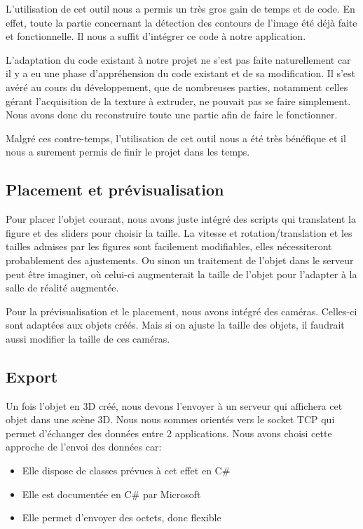 \documentclass[a4paper,11pt]{article}
\begin{document}
			L'utilisation de cet outil nous a permis un très gros gain de temps et de code. En effet, toute la partie concernant la détection des contours de l'image été déjà faite et fonctionnelle. Il nous a suffit d'intégrer ce code à notre application.
			
			L'adaptation du code existant à notre projet ne s'est pas faite naturellement car il y a eu une phase d'appréhension du code existant et de sa modification. Il s'est avéré au cours du développement, que de nombreuses parties, notamment celles gérant l'acquisition de la texture à extruder, ne pouvait pas se faire simplement. Nous avons donc du reconstruire toute une partie afin de faire le fonctionner.
			
			Malgré ces contre-temps, l'utilisation de cet outil nous a été très bénéfique et il nous a surement permis de finir le projet dans les temps.

		\subsection{Placement et prévisualisation}
		
			Pour placer l'objet courant, nous avons juste intégré des scripts qui translatent la figure et des sliders pour choisir la taille. La vitesse et rotation/translation et les tailles admises par les figures sont facilement modifiables, elles nécessiteront probablement des ajustements. Ou sinon un traitement de l'objet dans le serveur peut être imaginer, où celui-ci augmenterait la taille de l'objet pour l'adapter à la salle de réalité augmentée.
			
			Pour la prévisualisation et le placement, nous avons intégré des caméras. Celles-ci sont adaptées aux objets créés. Mais si on ajuste la taille des objets, il faudrait aussi modifier la taille de ces caméras.

		\subsection{Export}
			Un fois l'objet en 3D créé, nous devons l'envoyer à un serveur qui affichera cet objet dans une scène 3D.
			Nous nous sommes orientés vers le socket TCP qui permet d'échanger des données entre 2 applications.
			Nous avons choisi cette approche de l'envoi des données car:
			\begin{itemize}
				\item Elle dispose de classes prévues à cet effet en C\#
				\item Elle est documentée en C\# par Microsoft
				\item Elle permet d'envoyer des octets, donc flexible
			\end{itemize}
						
\end{document}
